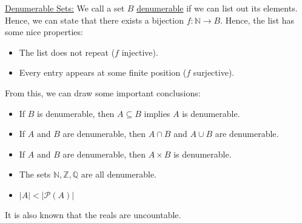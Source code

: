 \documentclass{article}
\newcommand{\sheader}[1]{\underline{#1:}}
\begin{document}
\sheader{Denumerable Sets} We call a set $B$ \underline{denumerable} if we can list 
out its elements. Hence, we can state that there exists a bijection $f: \mathbb{N} \to B$.
Hence, the list has some nice properties:
\begin{itemize}
    \item The list does not repeat ($f$ injective).
    \item Every entry appears at some finite position ($f$ surjective).
\end{itemize}
From this, we can draw some important conclusions:
\begin{itemize}
    \item If $B$ is denumerable, then $A \subseteq B$ implies $A$ is denumerable.
    \item If $A$ and $B$ are denumerable, then $A \cap B$ and $A \cup B$ are denumerable.
    \item If $A$ and $B$ are denumerable, then $A \times B$ is denumerable.
    \item The sets $\mathbb{N}, \mathbb{Z}, \mathbb{Q}$ are all denumerable.
    \item $|A| < |\mathcal{P}(A)|$
\end{itemize}
It is also known that the reals are uncountable.
\end{document}
